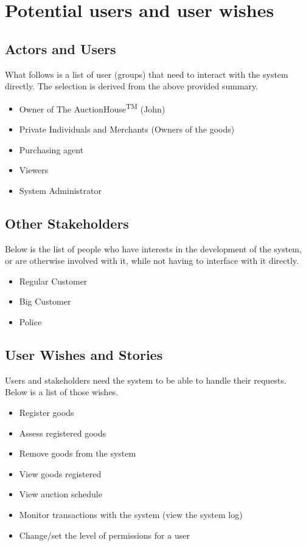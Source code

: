 \documentclass{article}
\begin{document}
\section*{Potential users and user wishes}
\subsection*{Actors and Users}
What follows is a list of user (groups) that need to interact with the system directly. The selection is derived from the above provided summary.
\begin{itemize}
	\item Owner of The AuctionHouse\textsuperscript{TM} (John)
	\item Private Individuals and Merchants (Owners of the goods)
	\item Purchasing agent
	\item Viewers
	\item System Administrator
\end{itemize}

\subsection*{Other Stakeholders}
Below is the list of people who have interests in the development of the system, or are otherwise involved with it, while not having to interface with it directly.
\begin{itemize}
	\item Regular Customer
	\item Big Customer
	\item Police
\end{itemize}

\subsection*{User Wishes and Stories}
Users and stakeholders need the system to be able to handle their requests. Below is a list of those wishes.
\begin{itemize}
	\item Register goods
	\item Assess registered goods
	\item Remove goods from the system
	\item View goods registered
	\item View auction schedule
	\item Monitor transactions with the system (view the system log)
	\item Change/set the level of permissions for a user
\end{itemize}


\end{document}
